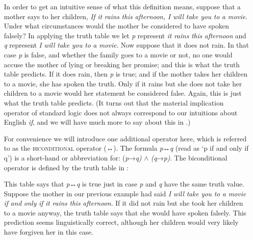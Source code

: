 In order to get an intuitive sense of what this definition means, suppose that a mother says to her children, \textit{If it rains this afternoon, I will take you to a movie}. Under what circumstances would the mother be considered to have spoken falsely? In applying the truth table we let \textit{p} represent \textit{it rains this afternoon} and \textit{q} represent \textit{I will take you to a movie}. Now suppose that it does not rain. In that case \textit{p} is false, and whether the family goes to a movie or not, no one would accuse the mother of lying or breaking her promise; and this is what the truth table predicts. If it does rain, then \textit{p} is true; and if the mother takes her children to a movie, she has spoken the truth. Only if it rains but she does not take her children to a movie would her statement be considered false. Again, this is just what the truth table predicts. (It turns out that the material implication operator of standard logic does not always correspond to our intuitions about English \textit{if}, and we will have much more to say about this in .)



For convenience we will introduce one additional operator here, which is referred to as the \textsc{biconditional} operator (↔). The formula \textit{p}↔\textit{q} (read as ‘p if and only if q’) is a short-hand or abbreviation for: (\textit{p}→\textit{q) $\wedge$} \textit{(q}→\textit{p)}. The biconditional operator is defined by the truth table in :



This table says that \textit{p}↔\textit{q} is true just in case \textit{p} and \textit{q} have the same truth value. Suppose the mother in our previous example had said \textit{I will take you to a movie if and only if it rains this afternoon}. If it did not rain but she took her children to a movie anyway, the truth table says that she would have spoken falsely. This prediction seems linguistically correct, although her children would very likely have forgiven her in this case.




